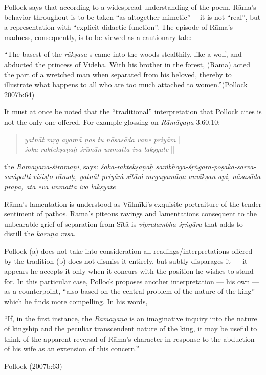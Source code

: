 Pollock says that according to a widespread understanding of the poem, Rāma’s behavior throughout is to be taken “as altogether mimetic”--- it is not “real”, but a representation with “explicit didactic function”. The episode of Rāma’s madness, consequently, is to be viewed as a cautionary tale: 

\begin{myquote}
“The basest of the {\sl rākṣasa}-s came into the woods stealthily, like a wolf, and abducted the princess of Videha. With his brother in the forest, (Rāma) acted the part of a wretched man when separated from his beloved, thereby to illustrate what happens to all who are too much attached to women.”\hfill (Pollock 2007b:64)
\end{myquote}

It must at once be noted that the “traditional” interpretation that Pollock cites is not the only one offered. For example glossing on {\sl Rāmāyaṇa} 3.60.10: 
\begin{quote}
{{\sl yatnāt mṛg ayamā ṇas tu nāsasāda vane priyām}} |\\
{\sl śoka-raktekṣaṇaḥ śrīmān unmatta iva lakṣyate} || 
\end{quote}
the {\sl Rāmāyaṇa-śiromaṇi}, says: {\sl śoka-raktekṣaṇaḥ saṁbhoga-śṛṅgāra-poṣaka-sarva-saṁpatti-viśiṣṭo rāmaḥ, yatnāt priyāṁ sītāṁ mṛgaya\-māṇa anvīkṣan api, nāsasāda prāpa, ata eva unmatta iva lakṣyate} |  

Rāma’s lamentation is understood as Vālmīki’s exquisite portraiture of the tender sentiment of pathos. Rāma’s piteous ravings and lamentations consequent to the unbearable grief of separation from Sītā is {\sl vipralambha-śṛṅgāra} that adds to distill the {\sl karuṇa rasa}. 

Pollock (a) does not take into consideration all readings/interpretations offered by the tradition (b) does not dismiss it entirely, but subtly disparages it --- it appears he accepts it only when it concurs with the position he wishes to stand for. In this particular case, Pollock proposes another interpretation --- his own --- as a counterpoint, “also based on the central problem of the nature of the king” which he finds more compelling. In his words, 

\begin{myquote}
“If, in the first instance, the {\sl Rāmāyaṇa} is an imaginative inquiry into the nature of kingship and the peculiar transcendent nature of the king, it may be useful to think of the apparent reversal of Rāma’s character in response to the abduction of his wife as an extension of this concern.”

\hfill Pollock (2007b:63)
\end{myquote}

